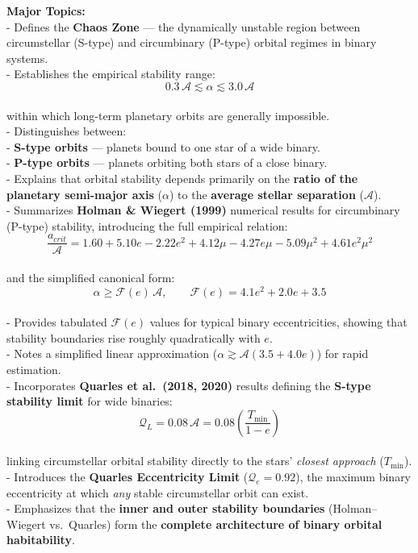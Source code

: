 \documentclass[
  letterpaper,
]{book}
\begin{document}
\textbf{Major Topics:}\\
- Defines the \textbf{Chaos Zone} --- the dynamically unstable region
between circumstellar (S-type) and circumbinary (P-type) orbital regimes
in binary systems.\\
- Establishes the empirical stability range:\\
\[0.3\,\mathcal{A} \lesssim \alpha \lesssim 3.0\,\mathcal{A}\]\\
within which long-term planetary orbits are generally impossible.\\
- Distinguishes between:\\
- \textbf{S-type orbits} --- planets bound to one star of a wide
binary.\\
- \textbf{P-type orbits} --- planets orbiting both stars of a close
binary.\\
- Explains that orbital stability depends primarily on the \textbf{ratio
of the planetary semi-major axis} (\(\alpha\)) to the \textbf{average
stellar separation} (\(\mathcal{A}\)).\\
- Summarizes \textbf{Holman \& Wiegert (1999)} numerical results for
circumbinary (P-type) stability, introducing the full empirical
relation:\\
\[\frac{a_{crit}}{\mathcal{A}} = 1.60 + 5.10e - 2.22e^2 + 4.12\mu - 4.27e\mu - 5.09\mu^2 + 4.61e^2\mu^2\]\\
and the simplified canonical form:\\
\[\alpha \ge \mathcal{F}(e)\,\mathcal{A}, \qquad \mathcal{F}(e) = 4.1e^2 + 2.0e + 3.5\]\\
- Provides tabulated \(\mathcal{F}(e)\) values for typical binary
eccentricities, showing that stability boundaries rise roughly
quadratically with \(e\).\\
- Notes a simplified linear approximation
(\(\alpha \gtrsim \mathcal{A}(3.5 + 4.0e)\)) for rapid estimation.\\
- Incorporates \textbf{Quarles et al.~(2018, 2020)} results defining the
\textbf{S-type stability limit} for wide binaries:\\
\[\mathcal{Q}_L = 0.08\,\mathcal{A} = 0.08\left(\frac{T_{\min}}{1 - e}\right)\]\\
linking circumstellar orbital stability directly to the stars'
\emph{closest approach} (\(T_{\min}\)).\\
- Introduces the \textbf{Quarles Eccentricity Limit}
(\(\mathcal{Q}_e = 0.92\)), the maximum binary eccentricity at which
\emph{any} stable circumstellar orbit can exist.\\
- Emphasizes that the \textbf{inner and outer stability boundaries}
(Holman--Wiegert vs.~Quarles) form the \textbf{complete architecture of
binary orbital habitability}.
\end{document}
